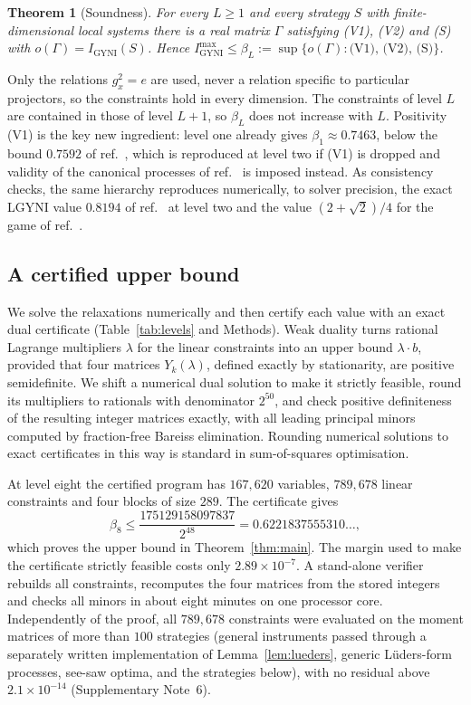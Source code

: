 \documentclass[11pt]{article}
\newtheorem{theorem}{Theorem}
\newcommand{\Igy}{I_{\mathrm{GYNI}}}
\newcommand{\Imax}{I_{\mathrm{GYNI}}^{\max}}
\begin{document}
\begin{theorem}[Soundness]\label{thm:sound}
For every $L\ge1$ and every strategy $S$ with finite-dimensional local systems there is a real matrix $\Gamma$ satisfying (V1), (V2) and (S) with $o(\Gamma)=\Igy(S)$. Hence $\Imax\le\beta_L:=\sup\{o(\Gamma):\text{(V1), (V2), (S)}\}$.
\end{theorem}

Only the relations $g_x^2=e$ are used, never a relation specific to particular projectors, so the constraints hold in every dimension. The constraints of level $L$ are contained in those of level $L+1$, so $\beta_L$ does not increase with $L$. Positivity (V1) is the key new ingredient: level one already gives $\beta_1\approx0.7463$, below the bound $0.7592$ of ref.~, which is reproduced at level two if (V1) is dropped and validity of the canonical processes of ref.~ is imposed instead. As consistency checks, the same hierarchy reproduces numerically, to solver precision, the exact LGYNI value $0.8194$ of ref.~ at level two and the value $(2+\sqrt2)/4$ for the game of ref.~.

\subsection*{A certified upper bound}
We solve the relaxations numerically and then certify each value with an exact dual certificate (Table~\ref{tab:levels} and Methods). Weak duality turns rational Lagrange multipliers $\lambda$ for the linear constraints into an upper bound $\lambda\cdot b$, provided that four matrices $Y_k(\lambda)$, defined exactly by stationarity, are positive semidefinite. We shift a numerical dual solution to make it strictly feasible, round its multipliers to rationals with denominator $2^{50}$, and check positive definiteness of the resulting integer matrices exactly, with all leading principal minors computed by fraction-free Bareiss elimination\cite{Bareiss1968}. Rounding numerical solutions to exact certificates in this way is standard in sum-of-squares optimisation\cite{PeyrlParrilo2008}.

At level eight the certified program has $167{,}620$ variables, $789{,}678$ linear constraints and four blocks of size $289$. The certificate gives
\begin{equation}
\beta_8\le\frac{175129158097837}{2^{48}}=0.6221837555310\ldots ,
\end{equation}
which proves the upper bound in Theorem~\ref{thm:main}. The margin used to make the certificate strictly feasible costs only $2.89\times10^{-7}$. A stand-alone verifier rebuilds all constraints, recomputes the four matrices from the stored integers and checks all minors in about eight minutes on one processor core. Independently of the proof, all $789{,}678$ constraints were evaluated on the moment matrices of more than $100$ strategies (general instruments passed through a separately written implementation of Lemma~\ref{lem:lueders}, generic L\"uders-form processes, see-saw optima, and the strategies below), with no residual above $2.1\times10^{-14}$ (Supplementary Note~6).
\end{document}
